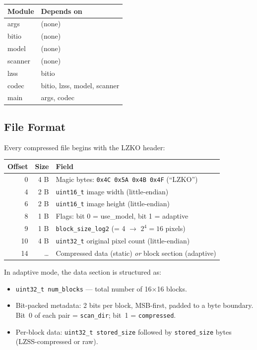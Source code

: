 \begin{center}
\begin{tabular}{>{\ttfamily}l >{\ttfamily}l}
\toprule
\textbf{Module} & \textbf{Depends on} \\
\midrule
args     & (none) \\
bitio    & (none) \\
model    & (none) \\
scanner  & (none) \\
lzss     & bitio \\
codec    & bitio, lzss, model, scanner \\
main     & args, codec \\
\bottomrule
\end{tabular}
\end{center}

\subsection{File Format}

Every compressed file begins with the LZKO header:

\begin{center}
\begin{tabular}{r r l}
\toprule
\textbf{Offset} & \textbf{Size} & \textbf{Field} \\
\midrule
0  & 4 B & Magic bytes: \texttt{0x4C 0x5A 0x4B 0x4F} (``LZKO'') \\
4  & 2 B & \texttt{uint16\_t} image width (little-endian) \\
6  & 2 B & \texttt{uint16\_t} image height (little-endian) \\
8  & 1 B & Flags: bit 0 = use\_model, bit 1 = adaptive \\
9  & 1 B & \texttt{block\_size\_log2} (= 4 $\to$ $2^4 = 16$ pixels) \\
10 & 4 B & \texttt{uint32\_t} original pixel count (little-endian) \\
14 & \ldots & Compressed data (static) \emph{or} block section (adaptive) \\
\bottomrule
\end{tabular}
\end{center}

In adaptive mode, the data section is structured as:
\begin{itemize}
  \item \texttt{uint32\_t num\_blocks} --- total number of 16$\times$16 blocks.
  \item Bit-packed metadata: 2 bits per block, MSB-first, padded to a byte boundary.
        Bit~0 of each pair = \texttt{scan\_dir}; bit~1 = \texttt{compressed}.
  \item Per-block data: \texttt{uint32\_t stored\_size} followed by \texttt{stored\_size} bytes
        (LZSS-compressed or raw).
\end{itemize}
